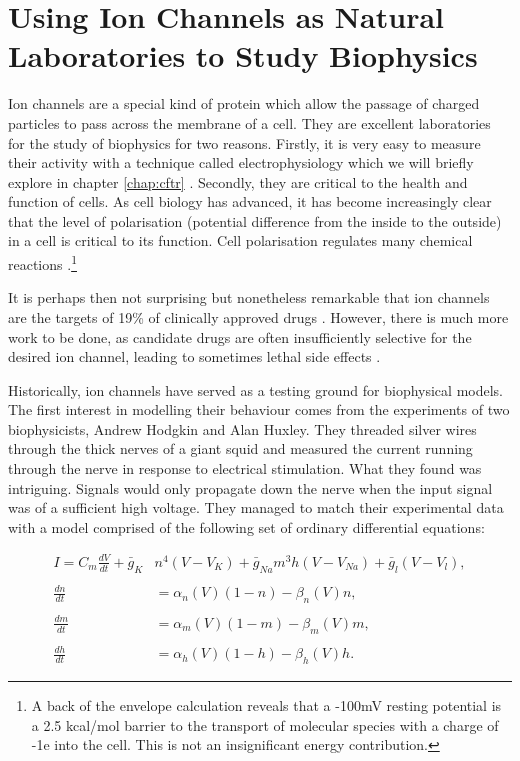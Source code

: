 \section{Using Ion Channels as Natural Laboratories to Study Biophysics}
\label{ion_channel_laboratories}

Ion channels are a special kind of protein which allow the passage of charged particles to pass across the membrane of a cell. They are excellent laboratories for the study of biophysics for two reasons. Firstly, it is very easy to measure their activity with a technique called electrophysiology which we will briefly explore in chapter \ref{chap:cftr} \cite{hille2001}. Secondly, they are critical to the health and function of cells. As cell biology has advanced, it has become increasingly clear that the level of polarisation (potential difference from the inside to the outside) in a cell is critical to its function. Cell polarisation regulates many chemical reactions \cite{catterall2011, muthuswamy2012, levin2014, levin2014a}.\footnote{A back of the envelope calculation reveals that a -100mV resting potential is a 2.5 kcal/mol barrier to the transport of molecular species with a charge of -1e into the cell. This is not an insignificant energy contribution.} 

It is perhaps then not surprising but nonetheless remarkable that ion channels are the targets of 19\% of clinically approved drugs \cite{santos2017}. However, there is much more work to be done, as candidate drugs are often insufficiently selective for the desired ion channel, leading to sometimes lethal side effects \cite{stansfeld2006, kaczorowski2008, waszkielewicz2013}.

Historically, ion channels have served as a testing ground for biophysical models. The first interest in modelling their behaviour comes from the experiments of two biophysicists, Andrew Hodgkin and Alan Huxley. They threaded silver wires through the thick nerves of a giant squid and measured the current running through the nerve in response to electrical stimulation. What they found was intriguing. Signals would only propagate down the nerve when the input signal was of a sufficient high voltage. They managed to match their experimental data with a model comprised of the following set of ordinary differential equations:

\begin{equation}
	\label{hh_equations}
\begin{aligned}
	I = C_m \frac{dV}{dt} + \bar{g}_K& n^4 (V - V_K) + \bar{g}_{Na} m^3 h (V - V_{Na} ) + \bar{g}_l (V-V_l) , \\ \\
	\frac{dn}{dt} &= \alpha_n(V)  (1-n) - \beta_n(V)  n, \\ \\
	\frac{dm}{dt} &= \alpha_m(V)  (1-m) - \beta_m(V)  m, \\ \\
	\frac{dh}{dt} &= \alpha_h(V)  (1-h) - \beta_h(V)  h.  
\end{aligned}
\end{equation}

